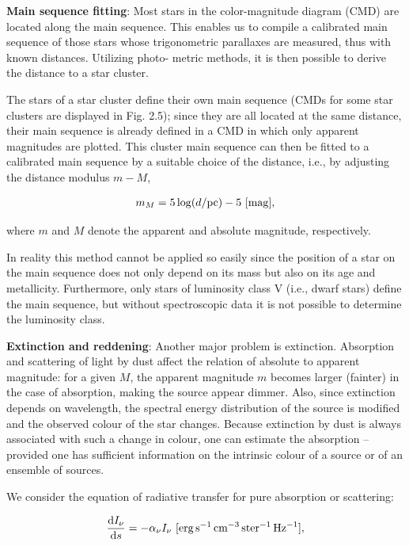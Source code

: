 \documentclass[a4paper,11pt]{article}
\begin{document}
{\noindent}\textbf{Main sequence fitting}: Most stars in the color-magnitude diagram (CMD) are located along the main sequence. This enables us to compile a calibrated main sequence of those stars whose trigonometric parallaxes are measured, thus with known distances. Utilizing photo- metric methods, it is then possible to derive the distance to a star cluster. 

{\noindent}The stars of a star cluster define their own main sequence (CMDs for some star clusters are displayed in Fig. 2.5); since they are all located at the same distance, their main sequence is already defined in a CMD in which only apparent magnitudes are plotted. This cluster main sequence can then be fitted to a calibrated main sequence by a suitable choice of the distance, i.e., by adjusting the distance modulus $m-M$,

\begin{align*}
    m_M = 5\log(d/{\rm pc}) - 5 ~ [{\rm mag}],
\end{align*}

{\noindent}where $m$ and $M$ denote the apparent and absolute magnitude, respectively.

{\noindent}In reality this method cannot be applied so easily since the position of a star on the main sequence does not only depend on its mass but also on its age and metallicity. Furthermore, only stars of luminosity class V (i.e., dwarf stars) define the main sequence, but without spectroscopic data it is not possible to determine the luminosity class.

{\noindent}\textbf{Extinction and reddening}: Another major problem is extinction. Absorption and scattering of light by dust affect the relation of absolute to apparent magnitude: for a given $M$, the apparent magnitude $m$ becomes larger (fainter) in the case of absorption, making the source appear dimmer. Also, since extinction depends on wavelength, the spectral energy distribution of the source is modified and the observed colour of the star changes. Because extinction by dust is always associated with such a change in colour, one can estimate the absorption -- provided one has sufficient information on the intrinsic colour of a source or of an ensemble of sources.

{\noindent}We consider the equation of radiative transfer for pure absorption or scattering:

\begin{align*}
    \frac{\mathrm{d}I_\nu}{\mathrm{d}s} = -\alpha_\nu I_\nu ~ [\rm erg\,s^{-1}\,cm^{-3}\,ster^{-1}\,Hz^{-1}],
\end{align*}
\end{document}
